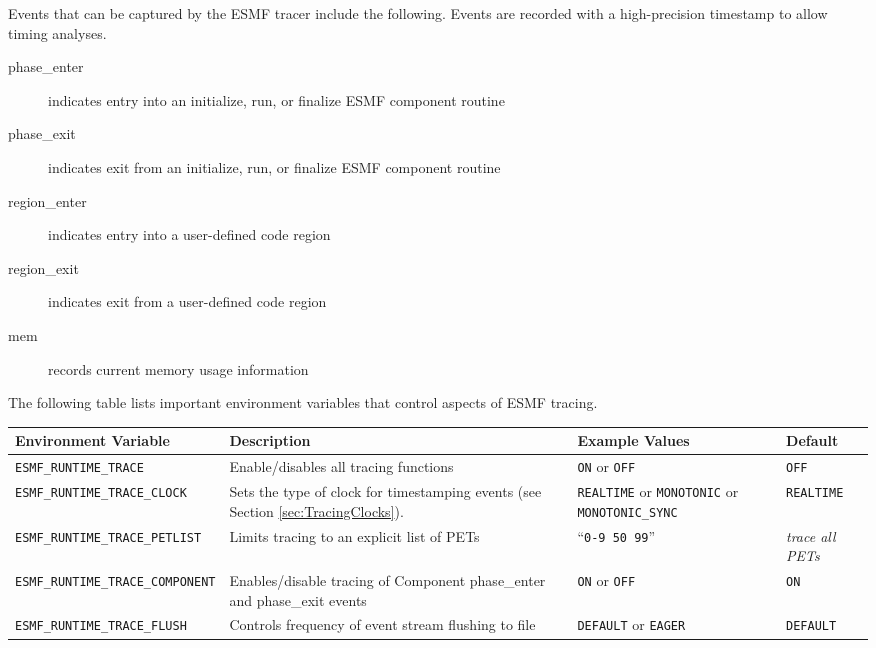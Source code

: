 Events that can be captured by the ESMF tracer include the following. Events
are recorded with a high-precision timestamp to allow timing analyses.
\begin{description}
\item [phase\_enter] indicates entry into an initialize, run, or finalize ESMF component routine
\item [phase\_exit] indicates exit from an initialize, run, or finalize ESMF component routine
\item [region\_enter] indicates entry into a user-defined code region
\item [region\_exit] indicates exit from a user-defined code region
\item [mem] records current memory usage information
\end{description}

The following table lists important environment variables that control
aspects of ESMF tracing.

\begin{tabular} {|p{6cm}|p{8cm}|p{6cm}|p{6cm}|}
     \hline\hline
     {\bf Environment Variable} & {\bf Description} & {\bf Example Values} & {\bf Default}\\
     \hline\hline
     {\tt ESMF\_RUNTIME\_TRACE} & Enable/disables all tracing functions & {\tt ON} or {\tt OFF} & {\tt OFF} \\
     \hline\hline                    
     {\tt ESMF\_RUNTIME\_TRACE\_CLOCK} & Sets the type of clock for timestamping events (see Section \ref{sec:TracingClocks}). & {\tt REALTIME} or {\tt MONOTONIC} or {\tt MONOTONIC\_SYNC} & {\tt REALTIME}\\
     \hline\hline
     {\tt ESMF\_RUNTIME\_TRACE\_PETLIST} & Limits tracing to an explicit list of PETs & ``{\tt 0-9 50 99}'' & {\em trace all PETs}\\
     \hline\hline
     {\tt ESMF\_RUNTIME\_TRACE\_COMPONENT} & Enables/disable tracing of Component phase\_enter and phase\_exit events & {\tt ON} or {\tt OFF} & {\tt ON} \\
     \hline\hline
     {\tt ESMF\_RUNTIME\_TRACE\_FLUSH} & Controls frequency of event stream flushing to file & {\tt DEFAULT} or {\tt EAGER} & {\tt DEFAULT} \\
     \hline\hline
\end{tabular}



